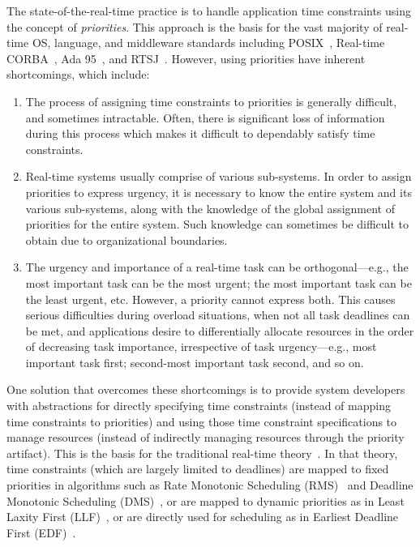 \documentclass[12pt,dvips]{report}
\begin{document}
The state-of-the-real-time practice is to handle application time constraints using the concept of \textit{priorities}. This approach is the basis for the vast majority of real-time OS, language, and middleware standards including POSIX~\cite{posix}, Real-time CORBA~\cite{omg0901}, Ada 95~\cite{ada95}, and RTSJ~\cite{rtsj-book}. 
However, using priorities have inherent shortcomings, which include:
\begin{enumerate}
\item The process of assigning time constraints to priorities is generally difficult, and sometimes intractable. Often, there is significant loss of information during this process which makes it difficult to dependably satisfy time constraints.

\item Real-time systems usually comprise of various sub-systems. In order to assign priorities to express urgency, it is necessary to know the entire system and its various sub-systems, along with the knowledge of the global assignment of priorities for the entire system. Such knowledge can sometimes be difficult to obtain due to organizational boundaries.

\item The urgency and importance of a real-time task can be orthogonal---e.g., the most important task can be the most urgent; the most important task can be the least urgent, etc. However, a priority cannot express both. This causes serious difficulties during overload situations, when not all task deadlines can be met, and applications desire to differentially allocate resources in the order of decreasing task importance, irrespective of task urgency---e.g., most important task first; second-most important task second, and so on.
\end{enumerate}

One solution that overcomes these shortcomings is to provide system developers with abstractions for directly specifying time constraints (instead of mapping time constraints to priorities) and using those time constraint specifications to manage resources (instead of indirectly managing resources through the priority artifact). This is the basis for the traditional real-time theory~\cite{RTbook, liu-book}. In that theory, time constraints (which are largely limited to deadlines) are mapped to fixed priorities in algorithms such as Rate Monotonic Scheduling (RMS)~\cite{liu73scheduling} and Deadline Monotonic Scheduling (DMS)~\cite{liu73scheduling}, or are mapped to dynamic priorities as in Least Laxity First (LLF)~\cite{mok83-llf}, or are directly used for scheduling as in Earliest Deadline First (EDF)~\cite{horn-edf}. 
\end{document}
